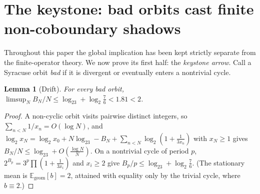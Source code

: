 \documentclass[11pt]{article}
\newcommand{\E}{\mathbb{E}}
\theoremstyle{plain}
\newtheorem{lemma}{Lemma}
\theoremstyle{definition}
\theoremstyle{remark}
\begin{document}
\section{The keystone: bad orbits cast finite non-coboundary shadows}
\label{sec:keystone}

Throughout this paper the global implication has been kept strictly
separate from the finite-operator theory. We now prove its first half:
the \emph{keystone arrow}. Call a Syracuse orbit \emph{bad} if it is
divergent or eventually enters a nontrivial cycle.

\begin{lemma}[Drift]\label{lem:drift}
For every bad orbit, $\limsup_N B_N/N\le\log_23+\log_2\tfrac76<1.81<2$.
\end{lemma}

\begin{proof}
A non-cyclic orbit visits pairwise distinct integers, so
$\sum_{n<N}1/x_n=O(\log N)$, and
$\log_2x_N=\log_2x_0+N\log_23-B_N+\sum_{n<N}\log_2(1+\tfrac1{3x_n})$
with $x_N\ge1$ gives $B_N/N\le\log_23+O(\tfrac{\log N}N)$. On a
nontrivial cycle of period $p$, $2^{B_p}=3^p\prod(1+\tfrac1{3x_i})$ and
$x_i\ge2$ give $B_p/p\le\log_23+\log_2\tfrac76$. (The stationary mean is
$\E_{\mathrm{geom}}[b]=2$, attained with equality only by the trivial
cycle, where $b\equiv2$.)
\end{proof}
\end{document}

